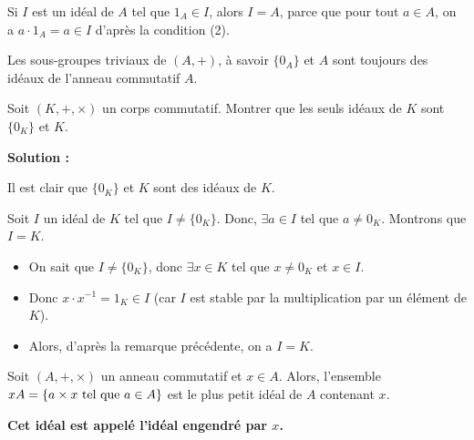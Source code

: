 \documentclass[12pt, a4paper]{report}
\begin{document}
\begin{remark}
    Si $I$ est un idéal de $A$ tel que $1_A \in I$, alors $I = A$, parce que pour tout $a \in A$, on a $a \cdot 1_A = a \in I$ d'après la condition (2).

    Les sous-groupes triviaux de $(A,+)$, à savoir $\{0_A\}$ et $A$ sont toujours des idéaux de l'anneau commutatif $A$.
\end{remark}

\begin{exercise}
    Soit $(K,+,\times)$ un corps commutatif. Montrer que les seuls idéaux de $K$ sont $\{0_K\}$ et $K$.

    \textbf{Solution :}

    Il est clair que $\{0_K\}$ et $K$ sont des idéaux de $K$.

    Soit $I$ un idéal de $K$ tel que $I \ne \{0_K\}$. Donc, $\exists a \in I$ tel que $a \ne 0_K$. Montrons que $I = K$.

    \begin{itemize}
        \item On sait que $I \ne \{0_K\}$, donc $\exists x \in K$ tel que $x \ne 0_K$ et $x \in I$.
        \item Donc $x\cdot x^{-1} = 1_K \in I$ (car $I$ est stable par la multiplication par un élément de $K$).
        \item Alors, d'après la remarque précédente, on a $I = K$.
    \end{itemize}
\end{exercise}

\begin{property}
    Soit $(A,+,\times)$ un anneau commutatif et $x \in A$. Alors, l'ensemble $xA = \{a \times x \text{ tel que } a \in A\}$ est le plus petit idéal de $A$ contenant $x$.

    \textbf{Cet idéal est appelé l'idéal engendré par $x$.}
\end{property}
\end{document}
